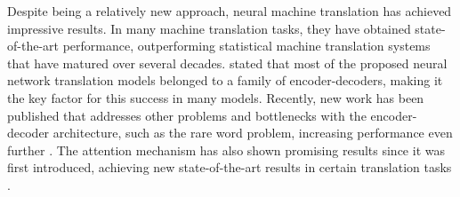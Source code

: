 Despite being a relatively new approach, neural machine translation has achieved impressive results. In many machine translation tasks, they have obtained state-of-the-art performance, outperforming statistical machine translation systems that have matured over several decades. \cite{bahdanau2014neural} stated that most of the proposed neural network translation models belonged to a family of encoder-decoders, making it the key factor for this success in many models. Recently, new work has been published that addresses other problems and bottlenecks with the encoder-decoder architecture, such as the rare word problem, increasing performance even further \citep{sennrich2015neural}. The attention mechanism has also shown promising results since it was first introduced, achieving new state-of-the-art results in certain translation tasks \citep{luong2015effective}.